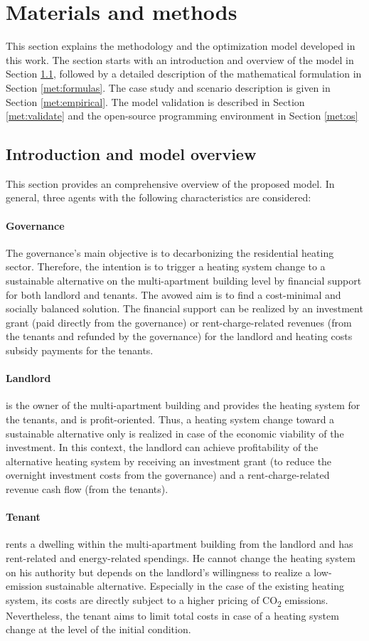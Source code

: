 \section{Materials and methods}\label{methodology}
This section explains the methodology and the optimization model developed in this work. The section starts with an introduction and overview of the model in Section \ref{met:intro}, followed by a detailed description of the mathematical formulation in Section \ref{met:formulas}. The case study and scenario description is given in Section \ref{met:empirical}. The model validation is described in Section \ref{met:validate} and the open-source programming environment in Section \ref{met:os}

\subsection{Introduction and model overview}\label{met:intro}
This section provides an comprehensive overview of the proposed model. In general, three agents with the following characteristics are considered:
\paragraph{Governance} The governance's main objective is to decarbonizing the residential heating sector. Therefore, the intention is to trigger a heating system change to a sustainable alternative on the multi-apartment building level by financial support for both landlord and tenants. The avowed aim is to find a cost-minimal and socially balanced solution. The financial support can be realized by an investment grant (paid directly from the governance) or rent-charge-related revenues (from the tenants and refunded by the governance) for the landlord and heating costs subsidy payments for the tenants. 
\paragraph{Landlord} is the owner of the multi-apartment building and provides the heating system for the tenants, and is profit-oriented. Thus, a heating system change toward a sustainable alternative only is realized in case of the economic viability of the investment. In this context, the landlord can achieve profitability of the alternative heating system by receiving an investment grant (to reduce the overnight investment costs from the governance) and a rent-charge-related revenue cash flow (from the tenants). 
\paragraph{Tenant} rents a dwelling within the multi-apartment building from the landlord and has rent-related and energy-related spendings. He cannot change the heating system on his authority but depends on the landlord's willingness to realize a low-emission sustainable alternative. Especially in the case of the existing heating system, its costs are directly subject to a higher pricing of CO\textsubscript{2} emissions. Nevertheless, the tenant aims to limit total costs in case of a heating system change at the level of the initial condition.\vspace{0.5cm}

